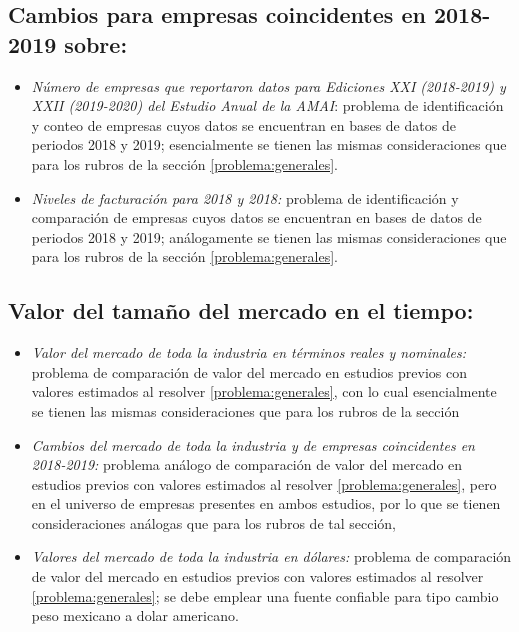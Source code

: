 \subsection{Cambios para empresas coincidentes en 2018-2019 sobre:}
\begin{itemize}
\item \textit{Número de empresas que reportaron datos para Ediciones XXI (2018-2019) y XXII (2019-2020) del Estudio Anual de la AMAI}: problema de identificación y conteo de empresas cuyos datos se encuentran en bases de datos de periodos 2018 y 2019; esencialmente se tienen las mismas consideraciones que para los rubros de la sección \ref{problema:generales}.
\item \textit{Niveles de facturación para 2018 y 2018:} problema de identificación y comparación de empresas cuyos datos se encuentran en bases de datos de periodos 2018 y 2019; análogamente se tienen las mismas consideraciones que para los rubros de la sección \ref{problema:generales}.
\end{itemize}

\subsection{Valor del tamaño del mercado en el tiempo:}
\begin{itemize}
\item \textit{Valor del mercado de toda la industria en términos reales y nominales:} problema de comparación de valor del mercado en estudios previos con valores estimados al resolver \ref{problema:generales}, con lo cual esencialmente se tienen las mismas consideraciones que para los rubros de la sección
\item \textit{Cambios del mercado de toda la industria y de empresas coincidentes en 2018-2019:} problema análogo de comparación de valor del mercado en estudios previos con valores estimados al resolver \ref{problema:generales}, pero en el universo de empresas presentes en ambos estudios, por lo que se tienen consideraciones análogas que para los rubros de tal sección,
\item \textit{Valores del mercado de toda la industria en dólares:} problema de comparación de valor del mercado en estudios previos con valores estimados al resolver \ref{problema:generales}; se debe emplear una fuente confiable para tipo cambio peso mexicano a dolar americano.
\end{itemize}

